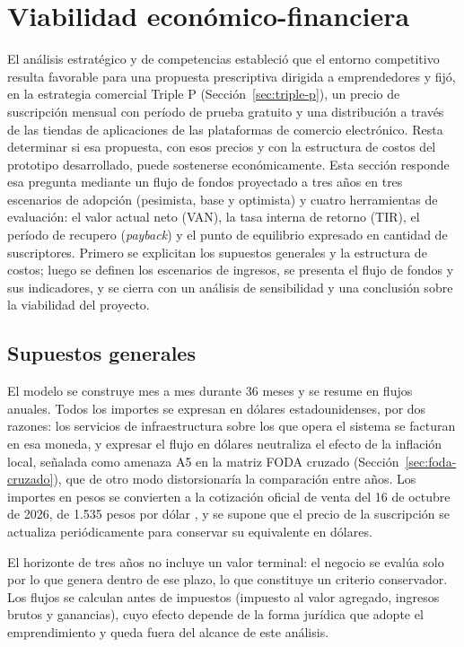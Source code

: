 \section{Viabilidad económico-financiera}
\label{sec:viabilidad-financiera}

El análisis estratégico y de competencias estableció que el entorno competitivo resulta favorable para una propuesta prescriptiva dirigida a emprendedores y fijó, en la estrategia comercial Triple P (Sección~\ref{sec:triple-p}), un precio de suscripción mensual con período de prueba gratuito y una distribución a través de las tiendas de aplicaciones de las plataformas de comercio electrónico. Resta determinar si esa propuesta, con esos precios y con la estructura de costos del prototipo desarrollado, puede sostenerse económicamente. Esta sección responde esa pregunta mediante un flujo de fondos proyectado a tres años en tres escenarios de adopción (pesimista, base y optimista) y cuatro herramientas de evaluación: el valor actual neto (VAN), la tasa interna de retorno (TIR), el período de recupero (\emph{payback}) y el punto de equilibrio expresado en cantidad de suscriptores. Primero se explicitan los supuestos generales y la estructura de costos; luego se definen los escenarios de ingresos, se presenta el flujo de fondos y sus indicadores, y se cierra con un análisis de sensibilidad y una conclusión sobre la viabilidad del proyecto.

\subsection{Supuestos generales}
\label{sec:viabilidad-supuestos}

El modelo se construye mes a mes durante 36 meses y se resume en flujos anuales. Todos los importes se expresan en dólares estadounidenses, por dos razones: los servicios de infraestructura sobre los que opera el sistema se facturan en esa moneda, y expresar el flujo en dólares neutraliza el efecto de la inflación local, señalada como amenaza A5 en la matriz FODA cruzado (Sección~\ref{sec:foda-cruzado}), que de otro modo distorsionaría la comparación entre años. Los importes en pesos se convierten a la cotización oficial de venta del 16 de octubre de 2026, de 1.535 pesos por dólar \parencite{DolarApi2026}, y se supone que el precio de la suscripción se actualiza periódicamente para conservar su equivalente en dólares.

El horizonte de tres años no incluye un valor terminal: el negocio se evalúa solo por lo que genera dentro de ese plazo, lo que constituye un criterio conservador. Los flujos se calculan antes de impuestos (impuesto al valor agregado, ingresos brutos y ganancias), cuyo efecto depende de la forma jurídica que adopte el emprendimiento y queda fuera del alcance de este análisis.

